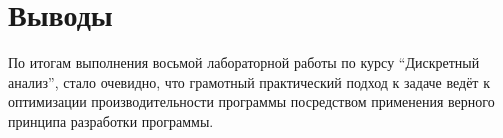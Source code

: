 \section{Выводы}

По итогам выполнения восьмой лабораторной работы по курсу \enquote{Дискретный анализ}, стало очевидно, что грамотный практический подход к задаче ведёт к оптимизации производительности программы посредством применения верного принципа разработки программы. 

\pagebreak
